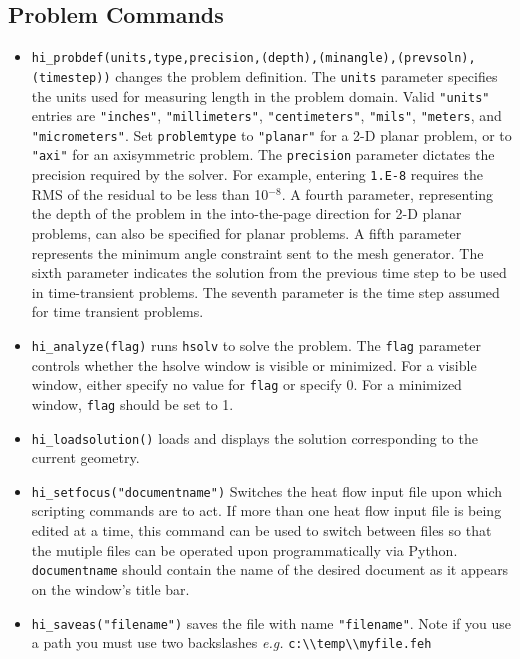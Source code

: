 \subsection{Problem Commands}

\begin{itemize}
\item {\tt hi\_probdef(units,type,precision,(depth),(minangle),(prevsoln),(timestep))} changes the problem
definition. The \texttt{units} parameter specifies the units used
for measuring length in the problem domain. Valid \texttt{"units"}
entries are
\texttt{"inches"}, \texttt{"millimeters"}, \texttt{"centimeters"},
\texttt{"mils"}, \texttt{"meters}, and \texttt{"micrometers"}. Set
\texttt{problemtype} to \texttt{"planar"} for a 2-D planar problem, or to
\texttt{"axi"} for an axisymmetric problem. The \texttt{precision} parameter
dictates the precision required by the solver. For example, entering
\texttt{1.E-8} requires the RMS of the residual to be less than 10$^{ - 8}$.
A fourth parameter, representing the depth of the problem in the
into-the-page direction for 2-D planar problems, can also be specified
for planar problems. A fifth parameter represents the minimum angle constraint sent to the mesh generator.
The sixth parameter indicates the solution from the previous time step
to be used in time-transient problems. The seventh parameter is the time step assumed
for time transient problems.

\item {\tt hi\_analyze(flag)} runs \texttt{hsolv} to solve the problem. The
\texttt{flag} parameter controls whether the hsolve window is visible or
minimized. For a visible window, either specify no value for
\texttt{flag} or specify 0. For a minimized window, \texttt{flag}
should be set to 1.

\item {\tt hi\_loadsolution()} loads and displays the solution corresponding to the
current geometry.

\item {\tt hi\_setfocus("documentname")} Switches the
heat flow input file upon which scripting commands are to act. If
more than one heat flow input file is being edited at a time,
this command can be used to switch between files so that the
mutiple files can be operated upon programmatically via Python. {\tt
documentname} should contain the name of the desired document as
it appears on the window's title bar.

\item {\tt hi\_saveas("filename")} saves the file with name
\texttt{"filename"}. Note if you use a path you must use two backslashes
{\em e.g.} \verb+c:\\temp\\myfile.feh+

\end{itemize}

